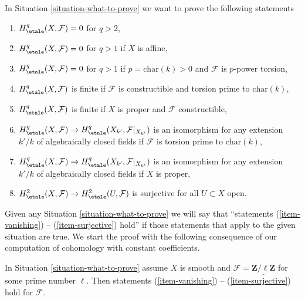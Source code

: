 \noindent
In Situation \ref{situation-what-to-prove}
we want to prove the following statements
\begin{enumerate}
\item
\label{item-vanishing}
$H^q_\etale(X, \mathcal{F}) = 0$ for $q > 2$,
\item
\label{item-vanishing-affine}
$H^q_\etale(X, \mathcal{F}) = 0$ for $q > 1$ if $X$ is affine,
\item
\label{item-vanishing-p-p}
$H^q_\etale(X, \mathcal{F}) = 0$ for $q > 1$ if $p = \text{char}(k) > 0$
and $\mathcal{F}$ is $p$-power torsion,
\item
\label{item-finite-prime-to-p}
$H^q_\etale(X, \mathcal{F})$ is finite if $\mathcal{F}$ is
constructible and torsion prime to $\text{char}(k)$,
\item
\label{item-finite-proper}
$H^q_\etale(X, \mathcal{F})$ is finite if $X$ is proper and
$\mathcal{F}$ constructible,
\item
\label{item-base-change-prime-to-p}
$H^q_\etale(X, \mathcal{F}) \to
H^q_\etale(X_{k'}, \mathcal{F}|_{X_{k'}})$ is an isomorphism
for any extension $k'/k$ of algebraically closed fields
if $\mathcal{F}$ is torsion prime to $\text{char}(k)$,
\item
\label{item-base-change-proper}
$H^q_\etale(X, \mathcal{F}) \to
H^q_\etale(X_{k'}, \mathcal{F}|_{X_{k'}})$ is an isomorphism
for any extension $k'/k$ of algebraically closed fields
if $X$ is proper,
\item
\label{item-surjective}
$H^2_\etale(X, \mathcal{F}) \to H^2_\etale(U, \mathcal{F})$
is surjective for all $U \subset X$ open.
\end{enumerate}
Given any Situation \ref{situation-what-to-prove}
we will say that
``statements (\ref{item-vanishing}) -- (\ref{item-surjective}) hold''
if those statements that apply to the given situation are true.
We start the proof with the following consequence of our computation
of cohomology with constant coefficients.

\begin{lemma}
\label{lemma-constant-smooth-statements}
In Situation \ref{situation-what-to-prove}
assume $X$ is smooth and $\mathcal{F} = \underline{\mathbf{Z}/\ell\mathbf{Z}}$
for some prime number $\ell$. Then statements
(\ref{item-vanishing}) -- (\ref{item-surjective}) hold
for $\mathcal{F}$.
\end{lemma}

